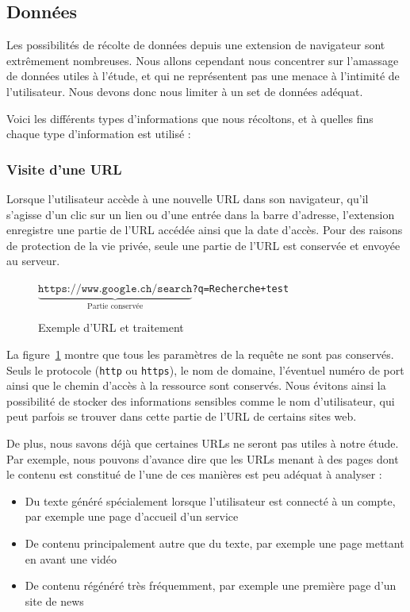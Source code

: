	\subsection{Données}\label{d-donnees}

		Les possibilités de récolte de données depuis une extension de navigateur sont extrêmement nombreuses. Nous allons cependant nous concentrer sur l'amassage de données utiles à l'étude, et qui ne représentent pas une menace à l'intimité de l'utilisateur. Nous devons donc nous limiter à un set de données adéquat.

		Voici les différents types d'informations que nous récoltons, et à quelles fins chaque type d'information est utilisé :

		\subsubsection{Visite d'une URL}
			
			Lorsque l'utilisateur accède à une nouvelle URL dans son navigateur, qu'il s'agisse d'un clic sur un lien ou d'une entrée dans la barre d'adresse, l'extension enregistre une partie de l'URL accédée ainsi que la date d'accès. Pour des raisons de protection de la vie privée, seule une partie de l'URL est conservée et envoyée au serveur.

			\begin{figure}[h]
				\centering
				$\underbrace{\texttt{https://www.google.ch/search}}_{\text{Partie conservée}}$\texttt{?q=Recherche+test}
				\caption{Exemple d'URL et traitement}
				\label{d-url}
			\end{figure}

			La figure~\ref{d-url} montre que tous les paramètres de la requête ne sont pas conservés. Seuls le protocole (\texttt{http} ou \texttt{https}), le nom de domaine, l'éventuel numéro de port ainsi que le chemin d'accès à la ressource sont conservés. Nous évitons ainsi la possibilité de stocker des informations sensibles comme le nom d'utilisateur, qui peut parfois se trouver dans cette partie de l'URL de certains sites web.

			De plus, nous savons déjà que certaines URLs ne seront pas utiles à notre étude. Par exemple, nous pouvons d'avance dire que les URLs menant à des pages dont le contenu est constitué de l'une de ces manières est peu adéquat à analyser :
			\begin{itemize}
				\item Du texte généré spécialement lorsque l'utilisateur est connecté à un compte, par exemple une page d'accueil d'un service
				\item De contenu principalement autre que du texte, par exemple une page mettant en avant une vidéo
				\item De contenu régénéré très fréquemment, par exemple une première page d'un site de news
			\end{itemize}
			
